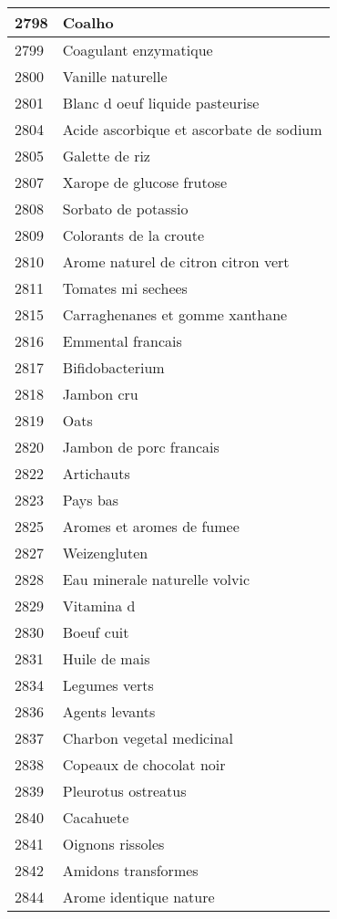 \begin{longtable}{|l|l|}
2798 & Coalho \\ \hline 
2799 & Coagulant enzymatique \\ \hline 
2800 & Vanille naturelle \\ \hline 
2801 & Blanc d oeuf liquide pasteurise \\ \hline 
2804 & Acide ascorbique et ascorbate de sodium \\ \hline 
2805 & Galette de riz \\ \hline 
2807 & Xarope de glucose frutose \\ \hline 
2808 & Sorbato de potassio \\ \hline 
2809 & Colorants de la croute \\ \hline 
2810 & Arome naturel de citron citron vert \\ \hline 
2811 & Tomates mi sechees \\ \hline 
2815 & Carraghenanes et gomme xanthane \\ \hline 
2816 & Emmental francais \\ \hline 
2817 & Bifidobacterium \\ \hline 
2818 & Jambon cru \\ \hline 
2819 & Oats \\ \hline 
2820 & Jambon de porc francais \\ \hline 
2822 & Artichauts \\ \hline 
2823 & Pays bas \\ \hline 
2825 & Aromes et aromes de fumee \\ \hline 
2827 & Weizengluten \\ \hline 
2828 & Eau minerale naturelle volvic \\ \hline 
2829 & Vitamina d \\ \hline 
2830 & Boeuf cuit \\ \hline 
2831 & Huile de mais \\ \hline 
2834 & Legumes verts \\ \hline 
2836 & Agents levants \\ \hline 
2837 & Charbon vegetal medicinal \\ \hline 
2838 & Copeaux de chocolat noir \\ \hline 
2839 & Pleurotus ostreatus \\ \hline 
2840 & Cacahuete \\ \hline 
2841 & Oignons rissoles \\ \hline 
2842 & Amidons transformes \\ \hline 
2844 & Arome identique nature \\ \hline 

\end{longtable}
